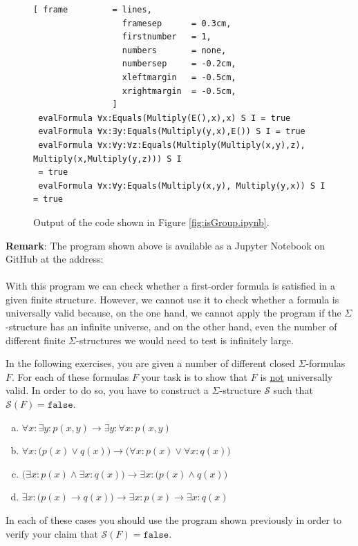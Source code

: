 \begin{figure}[!ht]
\centering
\begin{Verbatim}[ frame         = lines, 
                  framesep      = 0.3cm, 
                  firstnumber   = 1,
                  numbers       = none,
                  numbersep     = -0.2cm,
                  xleftmargin   = -0.5cm,
                  xrightmargin  = -0.5cm,
                ]
 evalFormula ∀x:Equals(Multiply(E(),x),x) S I = true
 evalFormula ∀x:∃y:Equals(Multiply(y,x),E()) S I = true
 evalFormula ∀x:∀y:∀z:Equals(Multiply(Multiply(x,y),z), Multiply(x,Multiply(y,z))) S I
 = true
 evalFormula ∀x:∀y:Equals(Multiply(x,y), Multiply(y,x)) S I = true
\end{Verbatim}
\vspace*{-0.3cm}
\caption{Output of the code shown in Figure \ref{fig:isGroup.ipynb}.}
\label{fig:isGroup.out}
\end{figure}
\noindent
\textbf{Remark}: The program shown above is available as a Jupyter Notebook on GitHub at the address:
\\[0.2cm]
\hspace*{0.0cm}
\href{https://github.com/karlstroetmann/Logic/blob/master/F-Sharp/Chapter-5/01-FOL-Evaluation.ipynb}{}
\\[0.2cm]
With this program we can check whether a
first-order formula is satisfied in a given finite structure. However, we cannot use it to check whether a
formula is universally valid because, on the one hand, we cannot apply the program if the $\Sigma$-structure has an
infinite universe, and on the other hand, even the number of different finite $\Sigma$-structures we would need
to test is infinitely large. \eox 

\exerciseEng
In the following exercises, you are given a number of different closed $\Sigma$-formulas $F$. For each of these
formulas $F$ your task is to show that $F$ is \underline{not} universally valid.  In order to do so,
you have to construct a $\Sigma$-structure $\mathcal{S}$ such that $\mathcal{S}(F) = \mathtt{false}$.
\begin{enumerate}[(a)]
\item $\forall x: \exists y: p(x,y) \rightarrow \exists y: \forall x: p(x,y)$
\item $\forall x: \bigl(p(x) \lor q(x)\bigr) \rightarrow \bigl(\forall x: p(x) \lor \forall x: q(x)\bigr)$
\item $\bigl(\exists x: p(x) \land \exists x: q(x)\bigr) \rightarrow \exists x: \bigl(p(x) \land q(x)\bigr)$
\item $\exists x: \bigl(p(x) \rightarrow q(x)\bigr) \rightarrow \exists x: p(x) \rightarrow \exists x: q(x)$
\end{enumerate}
In each of these cases you should use the program shown previously in order to verify your claim
that $\mathcal{S}(F) = \mathtt{false}$.

